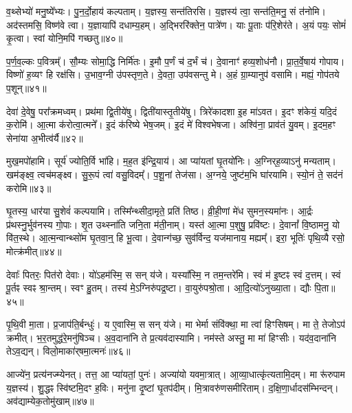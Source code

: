 व॒थ्सेभ्यो॑ मनु॒ष्ये᳚भ्यः।
पु॒न॒र्दो॒हाय॑ कल्पताम्।
य॒ज्ञस्य॒ सन्त॑\-ति\-रसि।
य॒ज्ञस्य॑ त्वा॒ सन्त॑\-ति॒\-मनु॒ सं त॑नोमि।
अद॑स्तमसि॒ विष्ण॑वे त्वा।
य॒ज्ञायापि॑ दधाम्य॒हम्।
अ॒द्भिररि॑क्तेन॒ पात्रे॑ण।
याः पू॒ताः प॑रि॒शेर॑ते।
अ॒यं पयः॒ सोमं॑ कृ॒त्वा।
स्वां योनि॒मपि॑ गच्छतु॥४०॥\ip

प॒र्ण॒व॒ल्कः प॒वित्रम्᳚।
सौ॒म्यः सोमा॒द्धि निर्मि॑तः।
इ॒मौ प॒र्णं च॑ द॒र्भं च॑।
दे॒वानाꣳ॑ हव्य॒शोध॑नौ।
प्रा॒त॒र्वे॒षाय॑ गोपाय।
विष्णो॑ ह॒व्यꣳ हि रक्ष॑सि।
उ॒भाव॒ग्नी उ॑पस्तृण॒ते।
दे॒वता॒ उप॑वसन्तु मे।
अ॒हं ग्रा॒म्यानुप॑ वसामि।
मह्यं॒ गोप॑तये प॒शून्॥४१॥\ip\anuvakamend[आभृ॑त इ॒मं गृ॑ह्णामि॒ पूर्व॒स्ताः पूर्वः॒ परि॑गृह्णामि सभापा॒ला इन्द्र॑ज्येष्ठेभ्य॒ आदि॑त्य व्रतपते सुस॒म्भृता॑ मे स॒ह पु॑नातु गहि नो वि॒श्वरू॑पा दधातु॒ पुन॑र्गच्छतु प॒शून् (याः पु॒रस्ता॑दि॒मामूर्ज॑मि॒ह प्र॒जा इ॒ह प॒शवो॒ऽयं पि॑तृ॒णाम॒ग्निः।)]

देवा॑ दे॒वेषु॒ परा᳚क्रमध्वम्।
प्रथ॑मा द्वि॒तीये॑षु।
द्विती॑यास्तृ॒तीये॑षु।
त्रिरे॑कादशा इ॒ह मा॑ऽवत।
इ॒दꣳ श॑केयं॒ यदि॒दं क॒रोमि॑।
आ॒त्मा क॑रोत्वा॒त्मने᳚।
इ॒दं क॑रिष्ये भेष॒जम्।
इ॒दं मे॑ विश्वभेषजा।
अश्वि॑ना॒ प्राव॑तं यु॒वम्।
इ॒दम॒हꣳ सेना॑या अ॒भीत्व॑र्यै॥४२॥\ip

मुख॒मपो॑हामि।
सूर्य॑ ज्योति॒र्वि भा॑हि।
म॒ह॒त इ॑न्द्रि॒याय॑।
आ प्या॑यतां घृ॒तयो॑निः।
अ॒ग्निर्‌\mbox{}ह॒व्याऽनु॑ मन्यताम्।
खम॑ङ्क्ष्व॒ त्वच॑मङ्क्ष्व।
सु॒रू॒पं त्वा॑ वसु॒विदम्᳚।
प॒शू॒नां तेज॑सा।
अ॒ग्नये॒ जुष्ट॑म॒भि घा॑रयामि।
स्यो॒नं ते॒ सद॑नं करोमि॥४३॥\ip

घृ॒तस्य॒ धार॑या सु॒शेवं॑ कल्पयामि।
तस्मि᳚न्थ्सीदा॒मृते॒ प्रति॑ तिष्ठ।
व्री॒ही॒णां मे॑ध सुमन॒स्यमा॑नः।
आ॒र्द्रः प्र॑थस्नु॒र्भुव॑नस्य गो॒पाः।
शृ॒त उथ्स्ना॑ति जनि॒ता म॑ती॒नाम्।
यस्त॑ आ॒त्मा प॒शुषु॒ प्रवि॑ष्टः।
दे॒वानां᳚ वि॒ष्ठामनु॒ यो वि॑त॒स्थे।
आ॒त्म॒न्वान्थ्सो॑म घृ॒तवा॒न्॒ हि भू॒त्वा।
दे॒वान्ग॑च्छ॒ सुव॑र्विन्द॒ यज॑मानाय॒ मह्यम्᳚।
इरा॒ भूतिः॑ पृथि॒व्यै रसो॒ मोत्क्र॑मीत्॥४४॥\ip

देवाः᳚ पितरः॒ पित॑रो देवाः।
यो॑ऽहम॑स्मि॒ स सन् य॑जे।
यस्या᳚स्मि॒ न तम॒न्तरे॑मि।
स्वं म॑ इ॒ष्टꣴ स्वं द॒त्तम्।
स्वं पू॒र्तꣴ स्वꣴ श्रा॒न्तम्।
स्वꣳ हु॒तम्।
तस्य॑ मे॒\-ऽग्निरु॑पद्र॒ष्टा।
वा॒युरु॑पश्रो॒ता।
आ॒दि॒त्यो॑\-ऽनुख्या॒ता।
द्यौः पि॒ता॥४५॥\ip

पृ॒थि॒वी मा॒ता।
प्र॒जा\-प॑ति॒र्बन्धुः॑।
य ए॒वास्मि॒ स सन् य॑जे।
मा भेर्मा संवि॑क्था॒ मा त्वा॑ हिꣳसिषम्।
मा ते॒ तेजोऽप॑ क्रमीत्।
भ॒र॒तमुद्ध॑रे॒मनु॑षिञ्च।
अ॒व॒दाना॑नि ते प्र॒त्यव॑दास्यामि।
नम॑स्ते अस्तु॒ मा मा॑ हिꣳसीः।
यद॑व॒दाना॑नि तेऽव॒द्यन्।
विलो॒माका॑र्‌\mbox{}षमा॒त्मनः॑॥४६॥\ip

आज्ये॑न॒ प्रत्य॑नज्म्येनत्।
तत्त॒ आ प्या॑यतां॒ पुनः॑।
अज्या॑यो यवमा॒त्रात्।
आ॒व्या॒धात्कृ॑त्यतामि॒दम्।
मा रू॑रुपाम य॒ज्ञस्य॑।
शु॒द्धꣴ स्वि॑ष्टमि॒दꣳ ह॒विः।
मनु॑ना दृ॒ष्टां घृ॒तप॑दीम्।
मि॒त्रावरु॑णसमीरिताम्।
द॒क्षि॒णा॒र्धादस॑म्भिन्दन्।
अव॑द्याम्ये\-क॒तोमु॑खाम्॥४७॥\ip


